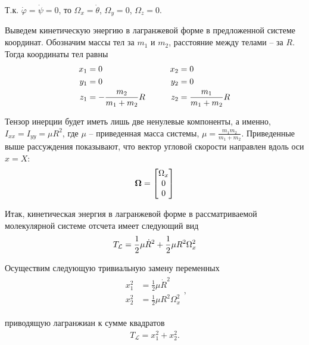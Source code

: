 \documentclass[12pt]{article}
\newcommand{\mL}{\mathcal{L}}
\newcommand{\mf}{\mathbf}
\newcommand{\dR}{\dot{R}}
\begin{document}
Т.к. $\dot{\varphi} = \dot{\psi} = 0$, то $\Omega_x = \dot{\theta}$, $\Omega_y = 0$, $\Omega_z = 0$.


Выведем кинетическую энергию в лагранжевой форме в предложенной системе координат. Обозначим массы тел за $m_1$ и $m_2$, расстояние между телами -- за $R$. Тогда координаты тел равны
\begin{gather}
	\begin{aligned}
			x_1 &= 0 \\
			y_1 &= 0 \\
			z_1 &= - \frac{m_2}{m_1 + m_2} R
	\end{aligned}
	\quad \quad \quad
	\begin{aligned}
			x_2 &= 0 \\
			y_2 &= 0 \\
			z_2 &= \frac{m_1}{m_1 + m_2} R 
	\end{aligned} \notag
\end{gather}

Тензор инерции будет иметь лишь две ненулевые компоненты, а именно, $I_{xx} = I_{yy} = \mu R^2$, где $\mu$ -- приведенная масса системы, $\mu = \displaystyle \frac{m_1 m_2}{m_1 + m_2}$. Приведенные выше рассуждения показывают, что вектор угловой скорости направлен вдоль оси $x = X$:
\begin{gather}
	\mf{\Omega} = \begin{bmatrix}
		\Omega_x \\
		0 \\ 
		0
	\end{bmatrix} \notag
\end{gather}

Итак, кинетическая энергия в лагранжевой форме в рассматриваемой молекулярной системе отсчета имеет следующий вид
\begin{gather}
		T_\mL = \frac{1}{2} \mu \dot{R}^2 + \frac{1}{2} \mu R^2 \Omega_x^2 \notag 
\end{gather}

Осуществим следующую тривиальную замену переменных
\begin{gather}
	\begin{aligned}
		x_1^2 &= \frac{1}{2} \mu \dR^2 \\
		x_2^2 &= \frac{1}{2} \mu R^2 \Omega_x^2
	\end{aligned}, \label{diatom1}
\end{gather}

приводящую лагранжиан к сумме квадратов
\begin{gather}
		T_\mL = x_1^2 + x_2^2. \label{diatom2}
\end{gather}
\end{document}
